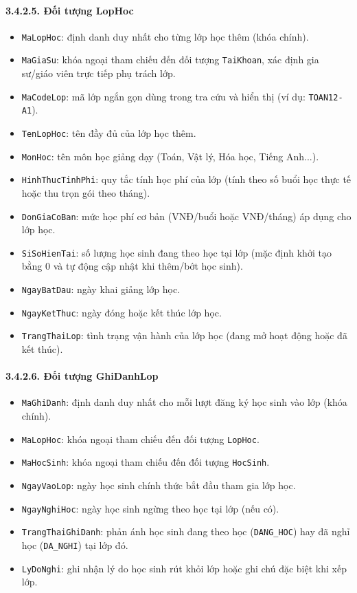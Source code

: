 \paragraph{3.4.2.5. Đối tượng LopHoc}\mbox{}
\begin{itemize}\setlength{\itemsep}{2pt}\setlength{\parskip}{0pt}
    \item \texttt{MaLopHoc}: định danh duy nhất cho từng lớp học thêm (khóa chính).
    \item \texttt{MaGiaSu}: khóa ngoại tham chiếu đến đối tượng \texttt{TaiKhoan}, xác định gia sư/giáo viên trực tiếp phụ trách lớp.
    \item \texttt{MaCodeLop}: mã lớp ngắn gọn dùng trong tra cứu và hiển thị (ví dụ: \texttt{TOAN12-A1}).
    \item \texttt{TenLopHoc}: tên đầy đủ của lớp học thêm.
    \item \texttt{MonHoc}: tên môn học giảng dạy (Toán, Vật lý, Hóa học, Tiếng Anh...).
    \item \texttt{HinhThucTinhPhi}: quy tắc tính học phí của lớp (tính theo số buổi học thực tế hoặc thu trọn gói theo tháng).
    \item \texttt{DonGiaCoBan}: mức học phí cơ bản (VNĐ/buổi hoặc VNĐ/tháng) áp dụng cho lớp học.
    \item \texttt{SiSoHienTai}: số lượng học sinh đang theo học tại lớp (mặc định khởi tạo bằng 0 và tự động cập nhật khi thêm/bớt học sinh).
    \item \texttt{NgayBatDau}: ngày khai giảng lớp học.
    \item \texttt{NgayKetThuc}: ngày đóng hoặc kết thúc lớp học.
    \item \texttt{TrangThaiLop}: tình trạng vận hành của lớp học (đang mở hoạt động hoặc đã kết thúc).
\end{itemize}

\paragraph{3.4.2.6. Đối tượng GhiDanhLop}\mbox{}
\begin{itemize}\setlength{\itemsep}{2pt}\setlength{\parskip}{0pt}
    \item \texttt{MaGhiDanh}: định danh duy nhất cho mỗi lượt đăng ký học sinh vào lớp (khóa chính).
    \item \texttt{MaLopHoc}: khóa ngoại tham chiếu đến đối tượng \texttt{LopHoc}.
    \item \texttt{MaHocSinh}: khóa ngoại tham chiếu đến đối tượng \texttt{HocSinh}.
    \item \texttt{NgayVaoLop}: ngày học sinh chính thức bắt đầu tham gia lớp học.
    \item \texttt{NgayNghiHoc}: ngày học sinh ngừng theo học tại lớp (nếu có).
    \item \texttt{TrangThaiGhiDanh}: phản ánh học sinh đang theo học (\texttt{DANG\_HOC}) hay đã nghỉ học (\texttt{DA\_NGHI}) tại lớp đó.
    \item \texttt{LyDoNghi}: ghi nhận lý do học sinh rút khỏi lớp hoặc ghi chú đặc biệt khi xếp lớp.
\end{itemize}

